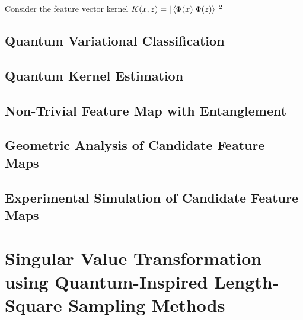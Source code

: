 \documentclass[main.tex]{subfiles}
\begin{document}
{Consider the feature vector kernel $K(x, z) = | \bra{\Phi(x)}\ket{\Phi(z)} |^2$

\subsection{Quantum Variational Classification}

\subsection{Quantum Kernel Estimation}

\subsection{Non-Trivial Feature Map with Entanglement}

\subsection{Geometric Analysis of Candidate Feature Maps}

\subsection{Experimental Simulation of Candidate Feature Maps}

%
%


\section{Singular Value Transformation using Quantum-Inspired Length-Square Sampling Methods}

}
\end{document}
